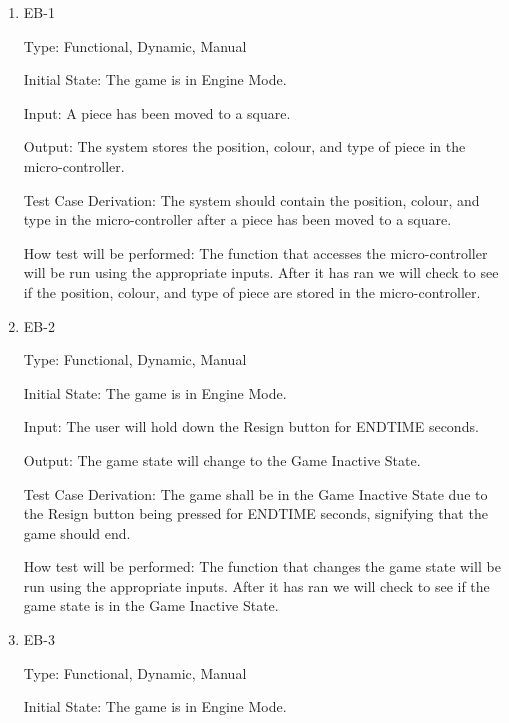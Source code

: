 \documentclass[12pt, titlepage]{article}
\begin{document}
  \begin{enumerate}

    \item{EB-1\\}

    Type: Functional, Dynamic, Manual
                        
    Initial State: The game is in Engine Mode.
                        
    Input: A piece has been moved to a square.
                        
    Output: The system stores the position, colour, and type of piece in the micro-controller.
                        
    Test Case Derivation: The system should contain the position, colour, and type in the micro-controller
    after a piece has been moved to a square.

    How test will be performed: The function that accesses the micro-controller will be run using the appropriate inputs.
    After it has ran we will check to see if the position, colour, and type of piece are stored in the micro-controller.  

    \item{EB-2\\}

    Type: Functional, Dynamic, Manual
                      
    Initial State: The game is in Engine Mode.
                        
    Input: The user will hold down the Resign button for ENDTIME seconds.
                        
    Output: The game state will change to the Game Inactive State.
                        
    Test Case Derivation: The game shall be in the Game Inactive State due to the Resign button being pressed for ENDTIME seconds, signifying that the game should end.
    
    How test will be performed: The function that changes the game state will be run using the appropriate inputs.
    After it has ran we will check to see if the game state is in the Game Inactive State.

    \item{EB-3\\}

    Type: Functional, Dynamic, Manual
                      
    Initial State: The game is in Engine Mode.
                        

\end{enumerate}
\end{document}
